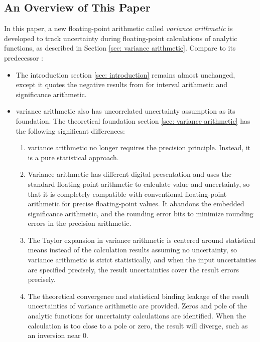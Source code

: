 \documentclass[twoside]{article}
\numberwithin{equation}{section}
\begin{document}
\subsection{ An Overview of This Paper}

In this paper, a new floating-point arithmetic called \emph{variance arithmetic} is developed to track uncertainty during floating-point calculations of analytic functions, as described in Section \ref{sec: variance arithmetic}. 
Compare to its predecessor \cite{Prev_Precision_Arithmetic}:
 \begin{itemize}
\item The introduction section \ref{sec: introduction} remains almost unchanged, except it quotes the negative results from \cite{Prev_Precision_Arithmetic} for interval arithmetic and significance arithmetic.

\item variance arithmetic also has uncorrelated uncertainty assumption as its foundation.
The theoretical foundation section \ref{sec: variance arithmetic} has the following significant differences:

\begin{enumerate}
\item variance arithmetic no longer requires the precision principle.  
Instead, it is a pure statistical approach. 

\item Variance arithmetic has different digital presentation and uses the standard floating-point arithmetic to calculate value and uncertainty, so that it is completely compatible with conventional floating-point arithmetic for precise floating-point values.
It abandons the embedded significance arithmetic, and the rounding error bits to minimize rounding errors in the precision arithmetic.

\item The Taylor expansion in variance arithmetic is centered around statistical means instead of the calculation results assuming no uncertainty, so variance arithmetic is strict statistically, and when the input uncertainties are specified precisely, the result uncertainties cover the result errors precisely.

\item The theoretical convergence and statistical binding leakage of the result uncertainties of variance arithmetic are provided.
Zeros and pole of the analytic functions for uncertainty calculations are identified.
When the calculation is too close to a pole or zero, the result will diverge, such as an inversion near $0$.


\end{enumerate}
\end{itemize}
\end{document}
